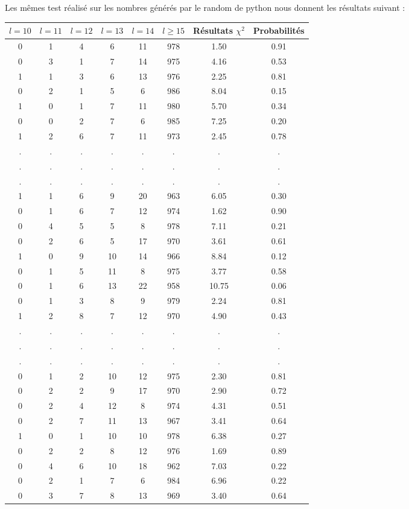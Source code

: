 \documentclass[12pt,a4paper]{article}
\begin{document}
Les mêmes test réalisé sur les nombres générés par le random de python nous donnent les résultats suivant :


\begin{center}
\begin{tabular}{|c|c|c|c|c|c|c|c|}
\hline
$l = 10$ & $l = 11$ & $l = 12$ & $l = 13$ & $l = 14$ & $l \geq 15$ & Résultats $\chi^2$ & Probabilités \\ \hline
0 & 1 & 4 & 6 & 11 & 978 &  1.50 &  0.91\\ \hline
0 & 3 & 1 & 7 & 14 & 975 &  4.16 &  0.53\\ \hline
1 & 1 & 3 & 6 & 13 & 976 &  2.25 &  0.81\\ \hline
0 & 2 & 1 & 5 & 6 & 986 &  8.04 &  0.15\\ \hline
1 & 0 & 1 & 7 & 11 & 980 &  5.70 &  0.34\\ \hline
0 & 0 & 2 & 7 & 6 & 985 &  7.25 &  0.20\\ \hline
1 & 2 & 6 & 7 & 11 & 973 &  2.45 &  0.78\\ \hline
 . & . & . & . & . & . & . & .\\ \hline
 . & . & . & . & . & . & . & .\\ \hline
 . & . & . & . & . & . & . & .\\ \hline

1 & 1 & 6 & 9 & 20 & 963 &  6.05 &  0.30\\ \hline
0 & 1 & 6 & 7 & 12 & 974 &  1.62 &  0.90\\ \hline
0 & 4 & 5 & 5 & 8 & 978 &  7.11 &  0.21\\ \hline
0 & 2 & 6 & 5 & 17 & 970 &  3.61 &  0.61\\ \hline
1 & 0 & 9 & 10 & 14 & 966 &  8.84 &  0.12\\ \hline
0 & 1 & 5 & 11 & 8 & 975 &  3.77 &  0.58\\ \hline
0 & 1 & 6 & 13 & 22 & 958 & 10.75 &  0.06\\ \hline
0 & 1 & 3 & 8 & 9 & 979 &  2.24 &  0.81\\ \hline
1 & 2 & 8 & 7 & 12 & 970 &  4.90 &  0.43\\ \hline
 . & . & . & . & . & . & . & .\\ \hline
 . & . & . & . & . & . & . & .\\ \hline
 . & . & . & . & . & . & . & .\\ \hline
0 & 1 & 2 & 10 & 12 & 975 &  2.30 &  0.81\\ \hline
0 & 2 & 2 & 9 & 17 & 970 &  2.90 &  0.72\\ \hline
0 & 2 & 4 & 12 & 8 & 974 &  4.31 &  0.51\\ \hline
0 & 2 & 7 & 11 & 13 & 967 &  3.41 &  0.64\\ \hline
1 & 0 & 1 & 10 & 10 & 978 &  6.38 &  0.27\\ \hline
0 & 2 & 2 & 8 & 12 & 976 &  1.69 &  0.89\\ \hline
0 & 4 & 6 & 10 & 18 & 962 &  7.03 &  0.22\\ \hline
0 & 2 & 1 & 7 & 6 & 984 &  6.96 &  0.22\\ \hline
0 & 3 & 7 & 8 & 13 & 969 &  3.40 &  0.64\\ \hline
\end{tabular}
\end{center}
\end{document}
